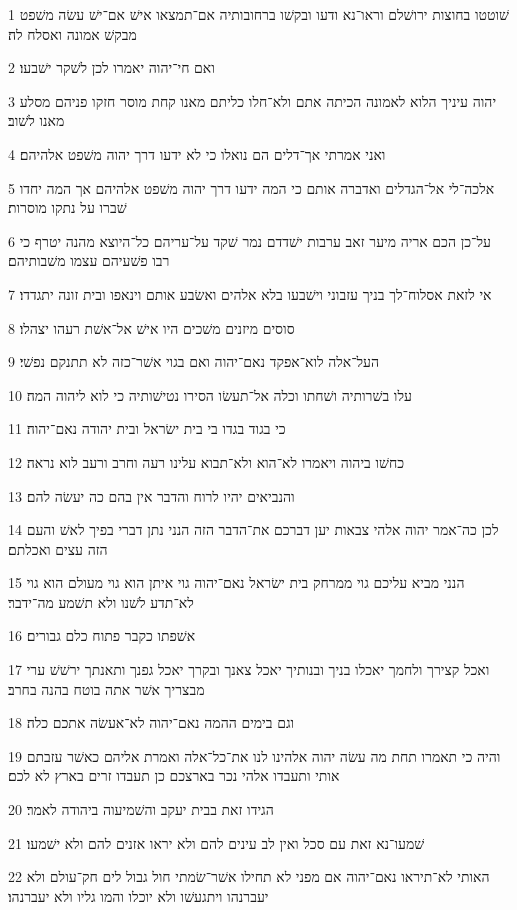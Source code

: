 \par 1 שׁוטטו בחוצות ירושׁלם וראו־נא ודעו ובקשׁו ברחובותיה אם־תמצאו אישׁ אם־ישׁ עשׂה משׁפט מבקשׁ אמונה ואסלח לה׃
\par 2 ואם חי־יהוה יאמרו לכן לשׁקר ישׁבעו׃
\par 3 יהוה עיניך הלוא לאמונה הכיתה אתם ולא־חלו כליתם מאנו קחת מוסר חזקו פניהם מסלע מאנו לשׁוב׃
\par 4 ואני אמרתי אך־דלים הם נואלו כי לא ידעו דרך יהוה משׁפט אלהיהם׃
\par 5 אלכה־לי אל־הגדלים ואדברה אותם כי המה ידעו דרך יהוה משׁפט אלהיהם אך המה יחדו שׁברו על נתקו מוסרות׃
\par 6 על־כן הכם אריה מיער זאב ערבות ישׁדדם נמר שׁקד על־עריהם כל־היוצא מהנה יטרף כי רבו פשׁעיהם עצמו משׁבותיהם׃
\par 7 אי לזאת אסלוח־לך בניך עזבוני וישׁבעו בלא אלהים ואשׂבע אותם וינאפו ובית זונה יתגדדו׃
\par 8 סוסים מיזנים משׁכים היו אישׁ אל־אשׁת רעהו יצהלו׃
\par 9 העל־אלה לוא־אפקד נאם־יהוה ואם בגוי אשׁר־כזה לא תתנקם נפשׁי׃
\par 10 עלו בשׁרותיה ושׁחתו וכלה אל־תעשׂו הסירו נטישׁותיה כי לוא ליהוה המה׃
\par 11 כי בגוד בגדו בי בית ישׂראל ובית יהודה נאם־יהוה׃
\par 12 כחשׁו ביהוה ויאמרו לא־הוא ולא־תבוא עלינו רעה וחרב ורעב לוא נראה׃
\par 13 והנביאים יהיו לרוח והדבר אין בהם כה יעשׂה להם׃
\par 14 לכן כה־אמר יהוה אלהי צבאות יען דברכם את־הדבר הזה הנני נתן דברי בפיך לאשׁ והעם הזה עצים ואכלתם׃
\par 15 הנני מביא עליכם גוי ממרחק בית ישׂראל נאם־יהוה גוי איתן הוא גוי מעולם הוא גוי לא־תדע לשׁנו ולא תשׁמע מה־ידבר׃
\par 16 אשׁפתו כקבר פתוח כלם גבורים׃
\par 17 ואכל קצירך ולחמך יאכלו בניך ובנותיך יאכל צאנך ובקרך יאכל גפנך ותאנתך ירשׁשׁ ערי מבצריך אשׁר אתה בוטח בהנה בחרב׃
\par 18 וגם בימים ההמה נאם־יהוה לא־אעשׂה אתכם כלה׃
\par 19 והיה כי תאמרו תחת מה עשׂה יהוה אלהינו לנו את־כל־אלה ואמרת אליהם כאשׁר עזבתם אותי ותעבדו אלהי נכר בארצכם כן תעבדו זרים בארץ לא לכם׃
\par 20 הגידו זאת בבית יעקב והשׁמיעוה ביהודה לאמר׃
\par 21 שׁמעו־נא זאת עם סכל ואין לב עינים להם ולא יראו אזנים להם ולא ישׁמעו׃
\par 22 האותי לא־תיראו נאם־יהוה אם מפני לא תחילו אשׁר־שׂמתי חול גבול לים חק־עולם ולא יעברנהו ויתגעשׁו ולא יוכלו והמו גליו ולא יעברנהו׃
